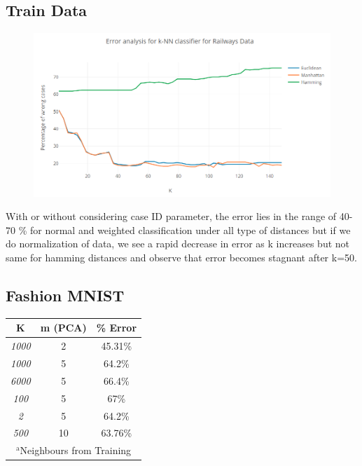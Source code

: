 \documentclass[conference]{IEEEtran}
\begin{document}
\subsection{Train Data}
\begin{figure}[htbp]
\centerline{\includegraphics{knnrailways.PNG}}
\label{fig}
\end{figure}
With or without considering case ID parameter, the error lies in the range of 40-70 \% for normal and weighted classification under all type of distances but if we do normalization of data, we see a rapid decrease in error as k increases but not same for hamming distances and observe that error becomes stagnant after k=50.
\subsection{Fashion MNIST}
\begin{table}[htbp]
\begin{center}
\begin{tabular}{|c|c|c|}
\hline
\textbf{K}&\textbf{m (PCA)}&\textbf{\% Error} \\
\hline
\textit{1000} &2&45.31\%\\
\hline
\textit{1000}&5&64.2\%\\
\hline
\textit{6000}&5&66.4\%\\
\hline
\textit{100}&5&67\%\\
\hline
\textit{2}&5&64.2\%\\
\hline
\textit{500}&10&63.76\%\\
\hline
\multicolumn{4}{s}{$^{\mathrm{a}}$Neighbours from Training }
\end{tabular}
\label{tab1}
\end{center}
\end{table}
\end{document}
